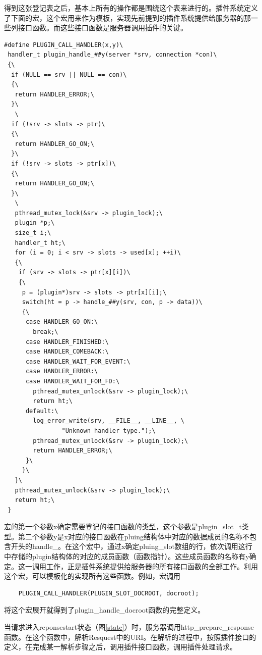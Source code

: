 \documentclass[twoside, xetex]{report}
\begin{document}
	得到这张登记表之后，基本上所有的操作都是围绕这个表来进行的。插件系统定义了下面的宏，这个宏用来作为模板，实现先前提到的插件系统提供给服务器的那一些列接口函数。而这些接口函数是服务器调用插件的关键。
\begin{verbatim}
#define PLUGIN_CALL_HANDLER(x,y)\
 handler_t plugin_handle_##y(server *srv, connection *con)\
 {\
  if (NULL == srv || NULL == con)\
  {\
   return HANDLER_ERROR;\
  }\
   \
  if (!srv -> slots -> ptr)\
  {\
   return HANDLER_GO_ON;\
  }\
  if (!srv -> slots -> ptr[x])\
  {\
   return HANDLER_GO_ON;\
  }\
   \
   pthread_mutex_lock(&srv -> plugin_lock);\
   plugin *p;\
   size_t i;\
   handler_t ht;\
   for (i = 0; i < srv -> slots -> used[x]; ++i)\
   {\
	if (srv -> slots -> ptr[x][i])\
	{\
	 p = (plugin*)srv -> slots -> ptr[x][i];\
	 switch(ht = p -> handle_##y(srv, con, p -> data))\
	 {\
	  case HANDLER_GO_ON:\
	    break;\
	  case HANDLER_FINISHED:\
	  case HANDLER_COMEBACK:\
	  case HANDLER_WAIT_FOR_EVENT:\
	  case HANDLER_ERROR:\
	  case HANDLER_WAIT_FOR_FD:\
		pthread_mutex_unlock(&srv -> plugin_lock);\
		return ht;\
	  default:\
		log_error_write(srv, __FILE__, __LINE__, \
				"Unknown handler type.");\
		pthread_mutex_unlock(&srv -> plugin_lock);\
		return HANDLER_ERROR;\
	  }\
     }\
   }\
   pthread_mutex_unlock(&srv -> plugin_lock);\
   return ht;\
 }
\end{verbatim}	

	宏的第一个参数x确定需要登记的接口函数的类型，这个参数是plugin\_slot\_t类型。第二个参数y是x对应的接口函数在pluing结构体中对应的数据成员的名称不包含开头的handle\_。在这个宏中，通过x确定pluing\_slot数组的行，依次调用这行中存储的plugin结构体的对应的成员函数（函数指针）。这些成员函数的名称有y确定。这一调用工作，正是插件系统提供给服务器的所有接口函数的全部工作。利用这个宏，可以模板化的实现所有这些函数。例如，宏调用
\begin{verbatim}
	PLUGIN_CALL_HANDLER(PLUGIN_SLOT_DOCROOT, docroot);
\end{verbatim}

	将这个宏展开就得到了plugin\_handle\_docroot函数的完整定义。
	
	当请求进入reponsestart状态（图\ref{state}）时，服务器调用http\_prepare\_response函数。在这个函数中，解析Resquest中的URI。在解析的过程中，按照插件接口的定义，在完成某一解析步骤之后，调用插件接口函数，调用插件处理请求。
	
\end{document}
